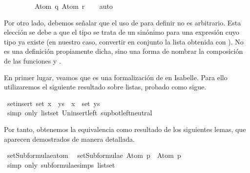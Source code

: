 \begin{isabellebody}
\ \ \ \ \ \ \ \ \ Atom\ q{\isacharcomma}\ Atom\ r{\isacharbraceright}{\isachardoublequoteclose}\isanewline
\ \ \isamarkupfalse%
\ auto%
\endisatagproof
{\isafoldproof}%
%
\isadelimproof
\ \ \ \isanewline
%
\endisadelimproof
{}\isamarkupfalse%
%
\begin{isamarkuptext}%
Por otro lado, debemos señalar que el uso de 
   para definir  no es 
  arbitrario. Esta elección se debe a que el tipo  
  se trata de un sinónimo para una expresión cuyo tipo ya existe (en 
  nuestro caso, convertir en conjunto la lista obtenida con 
  ). No es una definición propiamente dicha, sino 
  una forma de nombrar la composición de las funciones  y 
  .

  En primer lugar, veamos que  es una
  formalización de  en Isabelle. Para ello 
  utilizaremos el siguiente resultado sobre listas, probado como sigue.%
\end{isamarkuptext}\isamarkuptrue%
\isamarkupfalse%
\ set{\isacharunderscore}insert{\isacharcolon}\ {\isachardoublequoteopen}set\ {\isacharparenleft}x\ {\isacharhash}\ ys{\isacharparenright}\ {\isacharequal}\ {\isacharbraceleft}x{\isacharbraceright}\ {\isasymunion}\ set\ ys{\isachardoublequoteclose}\isanewline
%
\isadelimproof
\ \ %
\endisadelimproof
%
\isatagproof
{}\isamarkupfalse%
\ {\isacharparenleft}simp\ only{\isacharcolon}\ list{\isachardot}set{\isacharparenleft}{}{\isacharparenright}\ Un{\isacharunderscore}insert{\isacharunderscore}left\ sup{\isacharunderscore}bot{\isachardot}left{\isacharunderscore}neutral{\isacharparenright}%
\endisatagproof
{\isafoldproof}%
%
\isadelimproof
%
\endisadelimproof
%
\begin{isamarkuptext}%
Por tanto, obtenemos la equivalencia como resultado de los 
  siguientes lemas, que aparecen demostrados de manera detallada.%
\end{isamarkuptext}\isamarkuptrue%
\isamarkupfalse%
\ setSubformulae{\isacharunderscore}atom{\isacharcolon}\isanewline
\ \ {\isachardoublequoteopen}setSubformulae\ {\isacharparenleft}Atom\ p{\isacharparenright}\ {\isacharequal}\ {\isacharbraceleft}Atom\ p{\isacharbraceright}{\isachardoublequoteclose}\isanewline
%
\isadelimproof
\ \ \ \ %
\endisadelimproof
%
\isatagproof
{}\isamarkupfalse%
\ {\isacharparenleft}simp\ only{\isacharcolon}\ subformulae{\isachardot}simps{\isacharparenleft}{}{\isacharparenright}\ list{\isachardot}set{\isacharparenright}%

\end{isabellebody}
